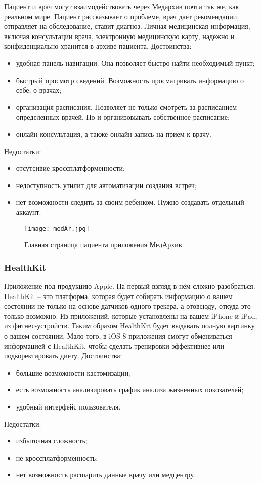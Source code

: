 Пациент и врач могут взаимодействовать через Медархив почти так же, как реальном мире. Пациент рассказывает о проблеме, врач дает рекомендации, отправляет на обследование, ставит диагноз. Личная медицинская информация, включая консультации врача, электронную медицинскую карту, надежно и конфиденциально хранится в архиве пациента.
Достоинства:
\begin{itemize}
  \item удобная панель навигации. Она позволяет быстро найти необходимый пункт;
  \item быстрый просмотр сведений. Возможность просматривать информацию о себе, о врачах;
  \item организация расписания. Позволяет не только смотреть за расписанием определенных врачей. Но и организовывать собственное расписание;
  \item онлайн консультация, а также онлайн запись на прием к врачу.
\end{itemize}
Недостатки:
\begin{itemize}
  \item отсутсивие кроссплатформенности;
  \item недоступность утилит для автоматизации создания встреч;
  \item нет возможности следить за своим ребенком. Нужно создавать отдельный аккаунт.
\end{itemize}
\begin{figure}[ht]
\centering
  \texttt{[image: medAr.jpg]}  
  \caption{ Главная страница пациента приложения МедАрхив }
  \label{fig:domain:manual_structure:credit_med}
\end{figure}

\subsubsection{HealthKit}

Приложение под продукцию Apple. На первый взгляд в нём сложно разобраться. HealthKit -- это платформа, которая будет собирать информацию о вашем состоянии не только на основе датчиков одного трекера, а отовсюду, откуда это только возможно. Из приложений, которые установлены на вашем iPhone и iPad, из фитнес-устройств. Таким образом HealthKit будет выдавать полную картинку о вашем состоянии. Мало того, в iOS 8 приложения смогут обмениваться информацией с HealthKit, чтобы сделать тренировки эффективнее или подкоректировать диету.
Достоинства:
\begin{itemize}
  \item большие возможности кастомизации;
  \item есть возможность анализировать график анализа жизненных покозателей;
  \item удобный интерфейс пользователя.
\end{itemize}
Недостатки:
\begin{itemize}
  \item избыточная сложность;
  \item не кроссплатформенность;
  \item нет возможность расшарить данные врачу или медцентру.
\end{itemize}


